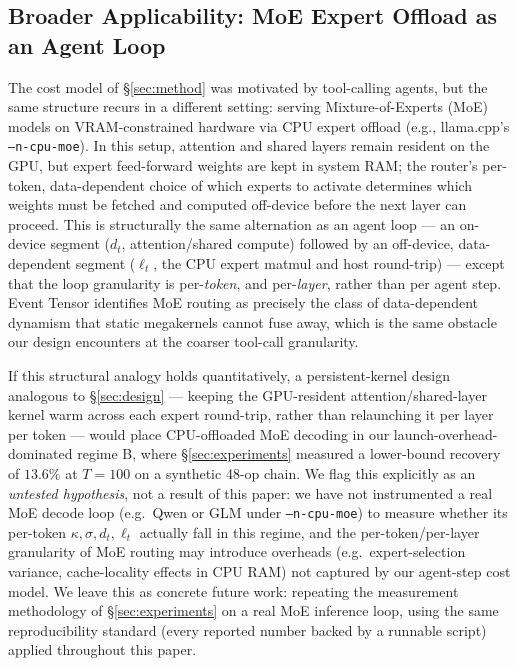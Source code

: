 \documentclass{article}
\begin{document}
\subsection{Broader Applicability: MoE Expert Offload as an Agent Loop}
\label{sec:moe}

The cost model of \S\ref{sec:method} was motivated by tool-calling
agents, but the same structure recurs in a different setting: serving
Mixture-of-Experts (MoE) models on VRAM-constrained hardware via
CPU expert offload (e.g., llama.cpp's \texttt{--n-cpu-moe}). In this
setup, attention and shared layers remain resident on the GPU, but
expert feed-forward weights are kept in system RAM; the router's
per-token, data-dependent choice of which experts to activate
determines which weights must be fetched and computed off-device
before the next layer can proceed. This is structurally the same
alternation as an agent loop --- an on-device segment ($d_t$,
attention/shared compute) followed by an off-device, data-dependent
segment ($\ell_t$, the CPU expert matmul and host round-trip) --- except
that the loop granularity is per-\emph{token}, and per-\emph{layer},
rather than per agent step. Event Tensor \citep{eventtensor2026}
identifies MoE routing as precisely the class of data-dependent
dynamism that static megakernels cannot fuse away, which is the same
obstacle our design encounters at the coarser tool-call granularity.

If this structural analogy holds quantitatively, a persistent-kernel
design analogous to \S\ref{sec:design} --- keeping the GPU-resident
attention/shared-layer kernel warm across each expert round-trip,
rather than relaunching it per layer per token --- would place
CPU-offloaded MoE decoding in our launch-overhead-dominated regime B,
where \S\ref{sec:experiments} measured a lower-bound recovery of
$13.6\%$ at $T=100$ on a synthetic 48-op chain. We flag this
explicitly as an \emph{untested hypothesis}, not a result of this
paper: we have not instrumented a real MoE decode loop (e.g.\ Qwen or
GLM under \texttt{--n-cpu-moe}) to measure whether its per-token
$\kappa,\sigma,d_t,\ell_t$ actually fall in this regime, and the
per-token/per-layer granularity of MoE routing may introduce
overheads (e.g.\ expert-selection variance, cache-locality effects
in CPU RAM) not captured by our agent-step cost model. We leave this
as concrete future work: repeating the measurement methodology of
\S\ref{sec:experiments} on a real MoE inference loop, using the same
reproducibility standard (every reported number backed by a runnable
script) applied throughout this paper.
\end{document}
